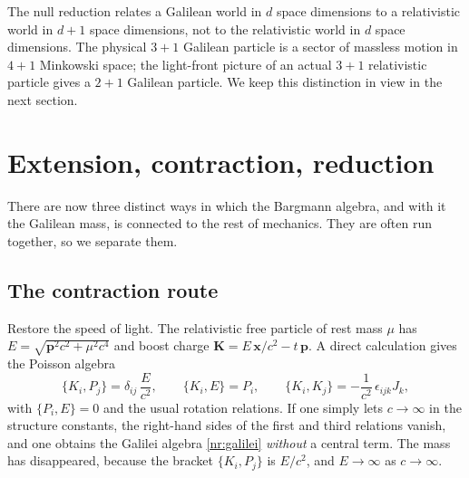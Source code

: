 \begin{nrrem}
The null reduction relates a Galilean world in $d$ space dimensions to a
relativistic world in $d+1$ space dimensions, not to the relativistic world in
$d$ space dimensions. The physical $3{+}1$ Galilean particle is a sector of
massless motion in $4{+}1$ Minkowski space; the light-front picture of an
actual $3{+}1$ relativistic particle gives a $2{+}1$ Galilean particle. We keep
this distinction in view in the next section.
\end{nrrem}

\section{Extension, contraction, reduction}
\label{sec:nr-limit}

There are now three distinct ways in which the Bargmann algebra, and with it the
Galilean mass, is connected to the rest of mechanics. They are often run
together, so we separate them.

\subsection{The contraction route}

Restore the speed of light. The relativistic free particle of rest mass $\mu$ has
$E=\sqrt{\mathbf{p}^2c^2+\mu^2c^4}$ and boost charge
$\mathbf{K}=E\,\mathbf{x}/c^2-t\,\mathbf{p}$. A direct calculation gives the
Poisson algebra
\begin{equation}
  \{K_i,P_j\}=\delta_{ij}\,\frac{E}{c^2},\qquad
  \{K_i,E\}=P_i,\qquad
  \{K_i,K_j\}=-\frac{1}{c^2}\,\epsilon_{ijk}J_k ,
  \label{nr:poincare}
\end{equation}
with $\{P_i,E\}=0$ and the usual rotation relations. If one simply lets
$c\to\infty$ in the structure constants, the right-hand sides of the first and
third relations vanish, and one obtains the Galilei algebra \eqref{nr:galilei}
\emph{without} a central term. The mass has disappeared, because the
bracket $\{K_i,P_j\}$ is $E/c^2$, and $E\to\infty$ as $c\to\infty$.

